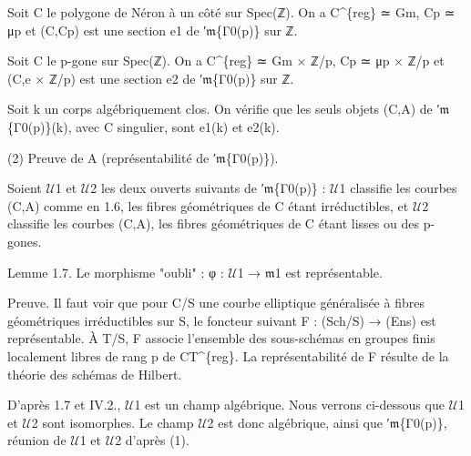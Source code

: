 \documentclass[11pt,a4paper]{article}
\begin{document}
Soit C le polygone de Néron à un côté sur Spec(ℤ). On a C\textasciicircum{}\{reg\} ≃ G\textunderscore{}m, C\textunderscore{}p ≃ μ\textunderscore{}p et (C,C\textunderscore{}p) est une section e\textunderscore{}1 de ′\ensuremath{\mathfrak{m}}\textunderscore{}\{Γ\textunderscore{}0(p)\} sur ℤ.

Soit C le p-gone sur Spec(ℤ). On a C\textasciicircum{}\{reg\} ≃ G\textunderscore{}m × ℤ/p, C\textunderscore{}p ≃ μ\textunderscore{}p × ℤ/p et (C,e × ℤ/p) est une section e\textunderscore{}2 de ′\ensuremath{\mathfrak{m}}\textunderscore{}\{Γ\textunderscore{}0(p)\} sur ℤ.

Soit k un corps algébriquement clos. On vérifie que les seuls objets (C,A) de ′\ensuremath{\mathfrak{m}}\textunderscore{}\{Γ\textunderscore{}0(p)\}(k), avec C singulier, sont e\textunderscore{}1(k) et e\textunderscore{}2(k).

(2) Preuve de A (représentabilité de ′\ensuremath{\mathfrak{m}}\textunderscore{}\{Γ\textunderscore{}0(p)\}).

Soient \ensuremath{\mathcal{U}}\textunderscore{}1 et \ensuremath{\mathcal{U}}\textunderscore{}2 les deux ouverts suivants de ′\ensuremath{\mathfrak{m}}\textunderscore{}\{Γ\textunderscore{}0(p)\} : \ensuremath{\mathcal{U}}\textunderscore{}1 classifie les courbes (C,A) comme en 1.6, les fibres géométriques de C étant irréductibles, et \ensuremath{\mathcal{U}}\textunderscore{}2 classifie les courbes (C,A), les fibres géométriques de C étant lisses ou des p-gones.

Lemme 1.7. Le morphisme "oubli" : φ : \ensuremath{\mathcal{U}}\textunderscore{}1 → \ensuremath{\mathfrak{m}}\textunderscore{}1 est représentable.

Preuve. Il faut voir que pour C/S une courbe elliptique généralisée à fibres géométriques irréductibles sur S, le foncteur suivant F : (Sch/S) → (Ens) est représentable. À T/S, F associe l'ensemble des sous-schémas en groupes finis localement libres de rang p de C\textunderscore{}T\textasciicircum{}\{reg\}. La représentabilité de F résulte de la théorie des schémas de Hilbert.

D'après 1.7 et IV.2., \ensuremath{\mathcal{U}}\textunderscore{}1 est un champ algébrique. Nous verrons ci-dessous que \ensuremath{\mathcal{U}}\textunderscore{}1 et \ensuremath{\mathcal{U}}\textunderscore{}2 sont isomorphes. Le champ \ensuremath{\mathcal{U}}\textunderscore{}2 est donc algébrique, ainsi que ′\ensuremath{\mathfrak{m}}\textunderscore{}\{Γ\textunderscore{}0(p)\}, réunion de \ensuremath{\mathcal{U}}\textunderscore{}1 et \ensuremath{\mathcal{U}}\textunderscore{}2 d'après (1).
\end{document}
